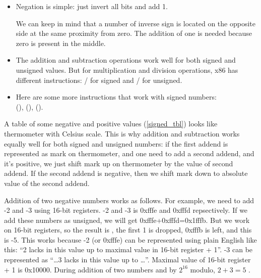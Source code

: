 \begin{itemize}
\label{sec:signednumbers:negation}
\item Negation is simple: just invert all bits and add 1.

We can keep in mind that a number of inverse sign is located on the opposite side at the same proximity from zero.
The addition of one is needed because zero is present in the middle.

\item 
	The addition and subtraction operations work well for both signed and unsigned values.
	But for multiplication and division operations, x86 has different instructions:
	/ for signed and / for unsigned.
\item
	Here are some more instructions that work with signed numbers:\\
	 (),  (),  ().
\end{itemize}

A table of some negative and positive values (\ref{signed_tbl}) looks like thermometer with Celsius scale.
This is why addition and subtraction works equally well for both signed and unsigned numbers:
if the first addend is represented as mark on thermometer, and one need to add a second addend,
and it's positive, we just shift mark up on thermometer by the value of second addend.
If the second addend is negative, then we shift mark down to absolute value of the second addend.

Addition of two negative numbers works as follows.
For example, we need to add -2 and -3 using 16-bit registers.
-2 and -3 is 0xfffe and 0xfffd repsectively.
If we add these numbers as unsigned, we will get 0xfffe+0xfffd=0x1fffb.
But we work on 16-bit registers, so the result is , the first 1 is dropped,
0xfffb is left, and this is -5.
This works because -2 (or 0xfffe) can be represented using plain English like this:
``2 lacks in this value up to maximal value in 16-bit register + 1''.
-3 can be represented as ``\dots 3 lacks in this value up to \dots''.
Maximal value of 16-bit register + 1 is 0x10000.
During addition of two numbers and  by $2^{16}$ modulo, $2+3=5$ .




